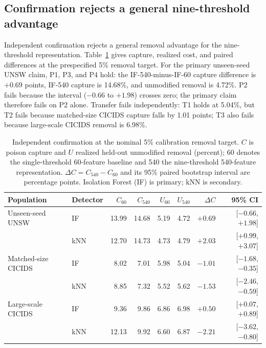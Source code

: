\documentclass[conference]{IEEEtran}
\begin{document}
\subsection{Confirmation rejects a general nine-threshold advantage}
Independent confirmation rejects a general removal advantage for the
nine-threshold representation.
Table~\ref{tab:confirmation} gives capture, realized cost, and paired
differences at the prespecified 5\% removal target. For the primary unseen-seed
UNSW claim, P1, P3, and P4 hold: the IF-540-minus-IF-60 capture difference is
$+0.69$ points, IF-540 capture is 14.68\%, and unmodified
removal is 4.72\%. P2 fails because the interval ($-0.66$ to $+1.98$) crosses
zero; the primary claim therefore fails on P2 alone. Transfer fails
independently: T1 holds at 5.04\%, but T2 fails because matched-size CICIDS capture
falls by 1.01 points; T3 also fails because large-scale CICIDS removal is 6.98\%.

\begin{table}[t]
\caption{Independent confirmation at the nominal 5\% calibration removal target.
$C$ is poison capture and $U$ realized held-out unmodified removal (percent);
60 denotes the single-threshold 60-feature baseline and 540 the
nine-threshold 540-feature representation. $\Delta C=C_{540}-C_{60}$ and its
95\% paired bootstrap interval are percentage points. Isolation Forest (IF) is primary; kNN is
secondary.}
\label{tab:confirmation}
\centering
\scriptsize
\setlength{\tabcolsep}{4.1pt}
\begin{tabular}{llrrrrrr}
\toprule
Population & Detector & $C_{60}$ & $C_{540}$ & $U_{60}$ & $U_{540}$ & $\Delta C$ & 95\% CI \\
\midrule
Unseen-seed UNSW & IF  & 13.99 & 14.68 & 5.19 & 4.72 & $+0.69$ & [$-0.66$, $+1.98$] \\
                 & kNN & 12.70 & 14.73 & 4.73 & 4.79 & $+2.03$ & [$+0.99$, $+3.07$] \\
Matched-size CICIDS   & IF  &  8.02 &  7.01 & 5.98 & 5.04 & $-1.01$ & [$-1.68$, $-0.35$] \\
                 & kNN &  8.85 &  7.32 & 5.52 & 5.62 & $-1.53$ & [$-2.46$, $-0.59$] \\
Large-scale CICIDS     & IF  &  9.36 &  9.86 & 6.86 & 6.98 & $+0.50$ & [$+0.07$, $+0.89$] \\
                 & kNN & 12.13 &  9.92 & 6.60 & 6.87 & $-2.21$ & [$-3.62$, $-0.80$] \\
\bottomrule
\end{tabular}
\end{table}
\end{document}
